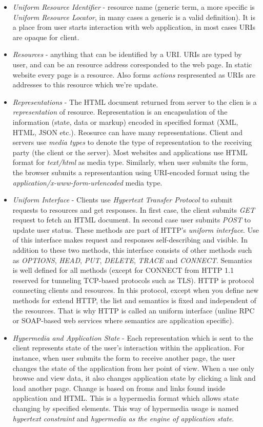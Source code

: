 \documentclass[11pt,a4paper]{article}
\begin{document}
\begin{itemize}
	\item \textit{Uniform Resource Identifier} - resource name (generic term, a more specific is \textit{Uniform Resource Locator}, in many cases a generic is a valid definition). It is a place from user starts interaction with web application, in most cases URIs are opaque for client. 
	\item \textit{Resources} - anything that can be identified by a URI. URIs are typed by user, and can be an resource address coresponded to the web page. In static website every page is a resource. Also forms \textit{actions} respresented as URIs are addresses to this resource which we're update.
	\item \textit{Representations} - The HTML document returned from server to the clien is a \textit{representation} of resource. Representation is an encapsulation of the information (state, data or markup) encoded in specified format (XML, HTML, JSON etc.). Reosurce can have many representations. Client and servers use \textit{media types} to denote the type of representation to the receiving party (the client or the server). Most websites and applications use HTML format for \textit{text/html} as media type. Similarly, when user submits the form, the browser submits a representantion using URI-encoded format using the \textit{application/x-www-form-urlencoded} media type.
	\item \textit{Uniform Interface} - Clients use \textit{Hypertext Transfer Protocol} to submit requests to resources and get responses. In first case, the client submits \textit{GET} request to fetch an HTML document. In second case user submits \textit{POST} to update user status. These methods are part of HTTP's \textit{uniform interface}. Use of this interface makes request and responses self-describing and visible. In addition to these two methods, this interface consists of other methods such as \textit{OPTIONS}, \textit{HEAD}, \textit{PUT}, \textit{DELETE}, \textit{TRACE} and \textit{CONNECT}. Semantics is well defined for all methods (except for CONNECT from HTTP 1.1 reserved for tunneling TCP-based protocols such as TLS). HTTP is protocol connecting clients and resources. In this protocol, except when you define new methods for extend HTTP, the list and semantics is fixed and independent of the resources. That is why HTTP is called an uniform interface (unline RPC or SOAP-based web services where semantics are application specific).
	\item \textit{Hypermedia and Application State} - Each representation which is sent to the client represents state of the user's interaction within the application. For instance, when user submits the form to receive another page, the user changes the state of the application from her point of view. When a use only browse and view data, it also changes application state by clicking a link and load another page. Change is based on froms and links found inside application and HTML. This is a hypermedia format which allows state changing by specified elements. This way of hypermedia usage is named \textit{hypertext constraint} and \textit{hypermedia as the engine of application state}.
\end{itemize}
\end{document}
